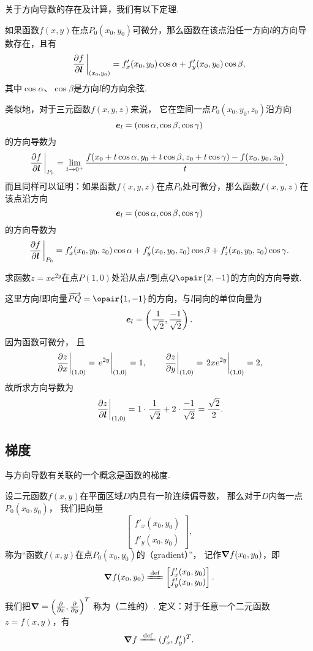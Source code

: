 关于方向导数的存在及计算，我们有以下定理.
\begin{theorem}[充分条件]
如果函数\(f(x,y)\)在点\(P_0(x_0,y_0)\)可微分，那么函数在该点沿任一方向\(l\)的方向导数存在，且有\[
\pdv{f}{\vb{l}}\eval_{(x_0,y_0)}
=f'_x(x_0,y_0) \cos\alpha + f'_y(x_0,y_0) \cos\beta,
\]其中\(\cos\alpha\)、\(\cos\beta\)是方向\(l\)的方向余弦.
\end{theorem}

类似地，对于三元函数\(f(x,y,z)\)来说，
它在空间一点\(P_0(x_0,y_0,z_0)\)沿方向\[
	\boldsymbol{e}_l = (\cos\alpha,\cos\beta,\cos\gamma)
\]的方向导数为\[
	\pdv{f}{\vb{l}}\eval_{P_0}
	= \lim_{t\to0^+}
	\frac{f(x_0+t\cos\alpha,y_0+t\cos\beta,z_0+t\cos\gamma)-f(x_0,y_0,z_0)}{t}.
\]
而且同样可以证明：如果函数\(f(x,y,z)\)在点\(P_0\)处可微分，那么函数\(f(x,y,z)\)在该点沿方向\[
	\boldsymbol{e}_l = (\cos\alpha,\cos\beta,\cos\gamma)
\]的方向导数为\[
\pdv{f}{\vb{l}}\eval_{P_0}
= f'_x(x_0,y_0,z_0) \cos\alpha + f'_y(x_0,y_0,z_0) \cos\beta + f'_z(x_0,y_0,z_0) \cos\gamma.
\]

\begin{example}
求函数\(z = x e^{2y}\)在点\(P(1,0)\)处沿从点\(P\)到点\(Q\opair{2,-1}\)的方向的方向导数.
\begin{solution}
这里方向\(l\)即向量\(\vec{PQ} = \opair{1,-1}\)的方向，与\(l\)同向的单位向量为\[
	\boldsymbol{e}_l
	= \left(
		\frac{1}{\sqrt{2}},
		\frac{-1}{\sqrt{2}}
	\right).
\]
因为函数可微分，
且\[
	\eval{\pdv{z}{x}}_{(1,0)}
	= \eval{e^{2y}}_{(1,0)}
	= 1,
	\qquad
	\eval{\pdv{z}{y}}_{(1,0)}
	= \eval{2xe^{2y}}_{(1,0)}
	= 2,
\]
故所求方向导数为\[
	\eval{\pdv{z}{\vb{l}}}_{(1,0)}
	= 1 \cdot \frac{1}{\sqrt{2}} + 2 \cdot \frac{-1}{\sqrt{2}}
	= \frac{\sqrt{2}}{2}.
\]
\end{solution}
\end{example}

\subsection{梯度}
与方向导数有关联的一个概念是函数的梯度.
\begin{definition}
设二元函数\(f(x,y)\)在平面区域\(D\)内具有一阶连续偏导数，
那么对于\(D\)内每一点\(P_0\allowbreak(x_0,y_0)\)，
我们把向量\[
	\begin{bmatrix}
		f'_x(x_0,y_0) \\
		f'_y(x_0,y_0)
	\end{bmatrix},
\]称为“函数\(f(x,y)\)在点\(P_0(x_0,y_0)\)的（gradient）”，
记作\(\grad f(x_0,y_0)\)，即\[
	\grad f(x_0,y_0)
	\defeq
	\begin{bmatrix}
		f'_x(x_0,y_0) \\
		f'_y(x_0,y_0)
	\end{bmatrix}.
\]

我们把\(\grad = \left(\pdv{x},\pdv{y}\right)^T\)
称为（二维的）.
定义：对于任意一个二元函数\(z=f(x,y)\)，有\[
	\grad f
	\defeq
	(f'_x,f'_y)^T.
\]
\end{definition}

